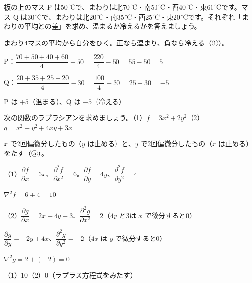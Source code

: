 \begin{kotoba}
\small
{}
\end{kotoba}



\begin{reidai}[まわりの平均との差]
板の上のマス P は50\,℃で、まわりは北70\,℃・南50\,℃・西40\,℃・東60\,℃です。マス Q は30\,℃で、まわりは北20\,℃・南35\,℃・西25\,℃・東20\,℃です。それぞれ「まわりの平均との差」を求め、温まるか冷えるかを答えましょう。\par
\kangaekata まわり4マスの平均から自分をひく。正なら温まり、負なら冷える（①）。\par
\shiki P：$\dfrac{70+50+40+60}{4}-50=\dfrac{220}{4}-50=55-50=5$\par
\kviiimq Q：$\dfrac{20+35+25+20}{4}-30=\dfrac{100}{4}-30=25-30=-5$\par
\kotae P は $+5$（温まる）、Q は $-5$（冷える）
\end{reidai}

\begin{reidai}[式のラプラシアン]
次の関数のラプラシアンを求めましょう。（1）$f=3x^2+2y^2$\quad（2）$g=x^2-y^2+4xy+3x$\par
\kangaekata $x$ で2回偏微分したもの（$y$ は止める）と、$y$ で2回偏微分したもの（$x$ は止める）をたす（⑤）。\par
\shiki（1）$\dfrac{\partial f}{\partial x}=6x$、$\dfrac{\partial^2f}{\partial x^2}=6$。$\dfrac{\partial f}{\partial y}=4y$、$\dfrac{\partial^2f}{\partial y^2}=4$\par
\kviiimq $\nabla^2f=6+4=10$\par
\kviiimq（2）$\dfrac{\partial g}{\partial x}=2x+4y+3$、$\dfrac{\partial^2g}{\partial x^2}=2$（$4y$ と3は $x$ で微分すると0）\par
\kviiimq $\dfrac{\partial g}{\partial y}=-2y+4x$、$\dfrac{\partial^2g}{\partial y^2}=-2$（$4x$ は $y$ で微分すると0）\par
\kviiimq $\nabla^2g=2+(-2)=0$\par
\kotae（1）10\quad（2）0（ラプラス方程式をみたす）
\end{reidai}

